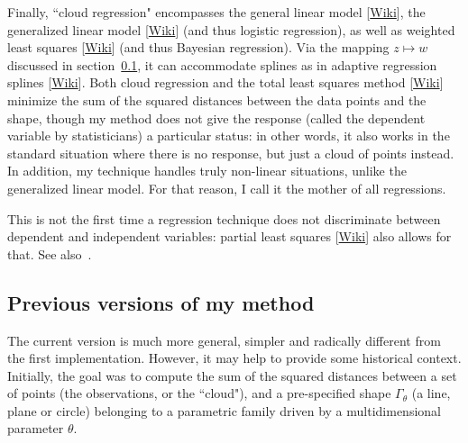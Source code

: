 \documentclass[oneside,10pt]{book}
\begin{document}
Finally, ``cloud regression" encompasses the \textcolor{index}{general linear model} [\href{https://en.wikipedia.org/wiki/General_linear_model}{Wiki}], 
the \textcolor{index}{generalized linear model} [\href{https://en.wikipedia.org/wiki/Generalized_linear_model}{Wiki}] (and thus logistic regression), 
 as well as \textcolor{index}{weighted least squares} [\href{https://en.wikipedia.org/wiki/Generalized_least_squares#Weighted_least_squares}{Wiki}]
 (and thus Bayesian regression). Via the mapping $z\mapsto w$ discussed in section~\ref{prevmeth}, it can accommodate splines as in  
\textcolor{index}{adaptive regression splines} [\href{https://en.wikipedia.org/wiki/Multivariate_adaptive_regression_spline}{Wiki}].   
 Both cloud regression and the \textcolor{index}{total least squares} method [\href{https://en.wikipedia.org/wiki/Total_least_squares}{Wiki}]  minimize the sum of the squared distances between the data points and the shape, though my method does not give the  response (called 
 the dependent variable by statisticians) a particular status: in other words, it also works in the standard situation where there is no response, but just a cloud of points instead. 
 In addition, my technique handles truly non-linear situations, unlike the generalized linear model. For that reason, I call it the mother of all regressions.

This is not the first time a regression technique does not discriminate between dependent and independent variables: \textcolor{index}{partial least squares} [\href{https://en.wikipedia.org/wiki/Partial_least_squares_regression}{Wiki}] 
  also allows for that.  See also~\cite{fit2015}. 


\subsection{Previous versions of my method}\label{prevmeth}\label{mapmp}

The current version is much more general, simpler and radically different from the first implementation. However, it may help to provide
 some historical context. Initially, the goal was to compute the sum of the squared distances between a set of points (the observations, or the ``cloud"), and
 a pre-specified shape $\Gamma_\theta$ (a line, plane or circle) belonging to a parametric family driven by a multidimensional parameter $\theta$.   
\end{document}
